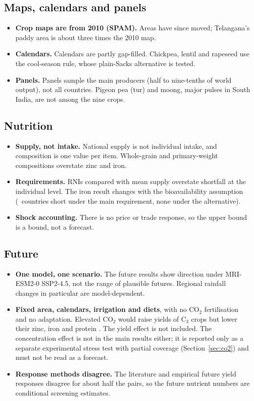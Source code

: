 \subsection{Maps, calendars and panels}
\begin{itemize}
\item \textbf{Crop maps are from 2010 (SPAM).} Areas have since moved; Telangana's paddy area is about three times
the 2010 map.
\item \textbf{Calendars.} Calendars are partly gap-filled. Chickpea, lentil and rapeseed use the cool-season rule,
whose plain-Sacks alternative is tested.
\item \textbf{Panels.} Panels sample the main producers (half to nine-tenths of world output), not all countries.
Pigeon pea (tur) and moong, major pulses in South India, are not among the nine crops.
\end{itemize}

\subsection{Nutrition}
\begin{itemize}
\item \textbf{Supply, not intake.} National supply is not individual intake, and composition is one value per item.
Whole-grain and primary-weight compositions overstate zinc and iron.
\item \textbf{Requirements.} RNIs compared with mean supply overstate shortfall at the individual level. The iron
result changes with the bioavailability assumption (\nIronShort\ countries short under the main requirement, none
under the alternative).
\item \textbf{Shock accounting.} There is no price or trade response, so the upper bound is a bound, not a forecast.
\end{itemize}

\subsection{Future}
\begin{itemize}
\item \textbf{One model, one scenario.} The future results show direction under MRI-ESM2-0 SSP2-4.5, not the range
of plausible futures. Regional rainfall changes in particular are model-dependent.
\item \textbf{Fixed area, calendars, irrigation and diets}, with no CO$_2$ fertilisation and no adaptation. Elevated
CO$_2$ would raise yields of C$_3$ crops but lower their zinc, iron and protein \citep{myers2014}. The yield effect is
not included. The concentration effect is not in the main results either; it is reported only as a separate
experimental stress test with partial coverage (Section~\ref{sec:co2}) and must not be read as a forecast.
\item \textbf{Response methods disagree.} The literature and empirical future yield responses disagree for about
half the pairs, so the future nutrient numbers are conditional screening estimates.
\end{itemize}

